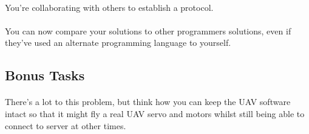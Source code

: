 \documentclass[11pt]{book}
\begin{document}
\paragraph{} You're collaborating with others to establish a protocol.

\paragraph{} You can now compare your solutions to other programmers
solutions, even if they've used an alternate programming language to yourself.

\subsection{Bonus Tasks}

\paragraph{} There's a lot to this problem, but think how you can keep the UAV
software intact so that it might fly a real UAV servo and motors whilst still
being able to connect to server at other times.

\clearpage
\end{document}

